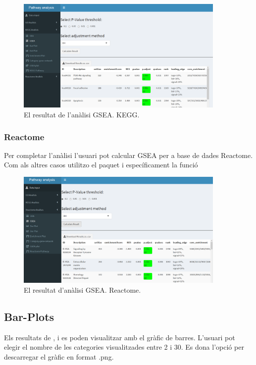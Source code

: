 \documentclass[]{article}
\begin{document}
\begin{figure}[H]
\centering
\includegraphics[width=0.9\textwidth]{App_F12_Items_KEGG_GSEA.png} 
\caption{El resultat de l'anàlisi GSEA. KEGG.}
\end{figure}

\subsubsection{Reactome}
Per completar l'anàlisi l'usuari pot calcular GSEA per a base de dades Reactome. Com als altres casos utilitzo el paquet  i específicament la funció 

\begin{figure}[H]
\centering
\includegraphics[width=0.9\textwidth]{App_F13_Items_RA_GSEA.png} 
\caption{El resultat d'anàlisi GSEA. Reactome.}
\end{figure}

\subsection{Bar-Plots}
Els resultats de ,  i  es poden visualitzar amb el gràfic de barres. L'usuari pot elegir el nombre de les categories visualitzades entre 2 i 30. Es dona l'opció per descarregar el gràfic en format .png.
\end{document}
